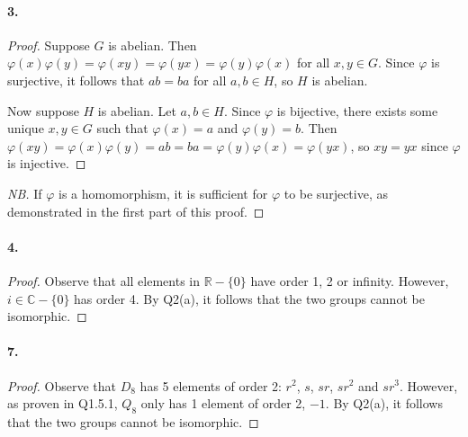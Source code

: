 \documentclass{article}
\begin{document}
\paragraph{3.}
\begin{proof}
  Suppose $G$ is abelian. Then $\varphi(x)\varphi(y) = \varphi(xy) =
  \varphi(yx) = \varphi(y)\varphi(x)$ for all $x, y \in G$. Since $\varphi$ is
  surjective, it follows that $ab = ba$ for all $a, b \in H$, so $H$ is abelian.

  Now suppose $H$ is abelian. Let $a, b \in H$. Since $\varphi$ is bijective,
  there exists some unique $x, y \in G$ such that $\varphi(x) = a$ and
  $\varphi(y) = b$. Then $\varphi(xy) = \varphi(x)\varphi(y) = ab = ba =
  \varphi(y)\varphi(x) = \varphi(yx)$, so $xy = yx$ since $\varphi$ is
  injective.
\end{proof}
\begin{proof}[NB]
  If $\varphi$ is a homomorphism, it is sufficient for $\varphi$ to be
  surjective, as demonstrated in the first part of this proof.
\end{proof}

\paragraph{4.}
\begin{proof}
  Observe that all elements in $\mathbb{R} - \{0\}$ have order 1, 2 or infinity.
  However, $i \in \mathbb{C} - \{0\}$ has order 4. By Q2(a), it follows that
  the two groups cannot be isomorphic.
\end{proof}

\paragraph{7.}
\begin{proof}
  Observe that $D_8$ has 5 elements of order 2: $r^2$, $s$, $sr$, $sr^2$ and
  $sr^3$. However, as proven in Q1.5.1, $Q_8$ only has 1 element of order 2,
  $-1$. By Q2(a), it follows that the two groups cannot be isomorphic.
\end{proof}
\end{document}
